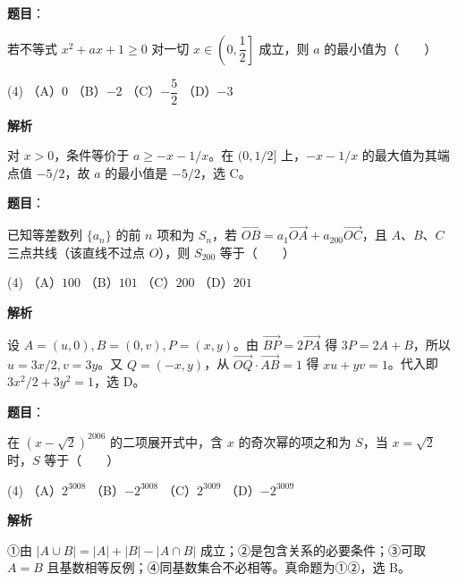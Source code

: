 \begin{answer}

\textbf{题目}：

若不等式 $x^2+ax+1\geqslant0$ 对一切 $x\in\left(0,\dfrac12\right]$ 成立，则 $a$ 的最小值为\mbox{（　　）}

\begin{gkopts}(4)
\task （A）$0$
\task （B）$-2$
\task （C）$-\dfrac52$
\task （D）$-3$
\end{gkopts}

\textbf{解析}

对 $x>0$，条件等价于 $a\ge-x-1/x$。在 $(0,1/2]$ 上，$-x-1/x$ 的最大值为其端点值 $-5/2$，故 $a$ 的最小值是 $-5/2$，选 C。


\end{answer}
\begin{answer}

\textbf{题目}：

已知等差数列 $\{a_n\}$ 的前 $n$ 项和为 $S_n$，若 $\overrightarrow{OB}=a_1\overrightarrow{OA}+a_{200}\overrightarrow{OC}$，且 $A\text{、}B\text{、}C$ 三点共线（该直线不过点 $O$），则 $S_{200}$ 等于\mbox{（　　）}

\begin{gkopts}(4)
\task （A）$100$
\task （B）$101$
\task （C）$200$
\task （D）$201$
\end{gkopts}

\textbf{解析}

设 $A=(u,0),B=(0,v),P=(x,y)$。由 $\overrightarrow{BP}=2\overrightarrow{PA}$ 得 $3P=2A+B$，所以 $u=3x/2,v=3y$。又 $Q=(-x,y)$，从 $\overrightarrow{OQ}\cdot\overrightarrow{AB}=1$ 得 $xu+yv=1$。代入即 $3x^2/2+3y^2=1$，选 D。


\end{answer}
\begin{answer}

\textbf{题目}：

在 $(x-\sqrt2)^{2006}$ 的二项展开式中，含 $x$ 的奇次幂的项之和为 $S$，当 $x=\sqrt2$ 时，$S$ 等于\mbox{（　　）}

\begin{gkopts}(4)
\task （A）$2^{3008}$
\task （B）$-2^{3008}$
\task （C）$2^{3009}$
\task （D）$-2^{3009}$
\end{gkopts}

\textbf{解析}

①由 $|A\cup B|=|A|+|B|-|A\cap B|$ 成立；②是包含关系的必要条件；③可取 $A=B$ 且基数相等反例；④同基数集合不必相等。真命题为①②，选 B。


\end{answer}
